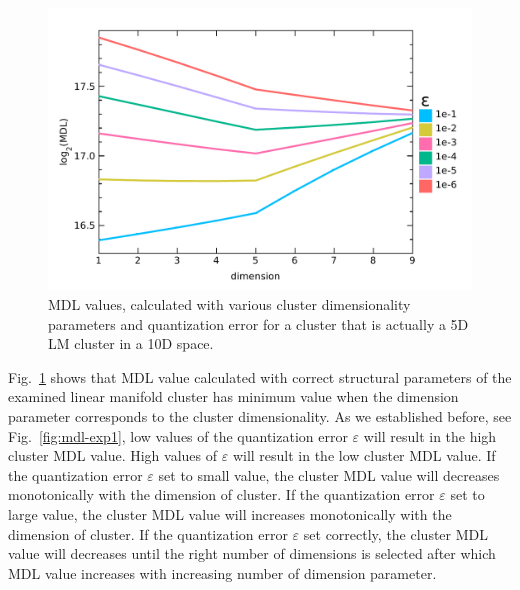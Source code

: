 \begin{figure}[ht]
\center
\includegraphics[width=\IfClass{IEEEtran}{3.5in}{4in}]{img/results_mdl-exp5_1.pdf}
\caption{MDL values, calculated with various cluster dimensionality parameters and quantization error \textepsilon for a cluster that is actually a 5D LM cluster in a 10D space.}
\label{fig:mdl-exp5}
\end{figure}



Fig.~\ref{fig:mdl-exp5} shows that MDL value calculated with correct structural
parameters of the examined linear manifold cluster has minimum value when
the dimension parameter corresponds to the cluster dimensionality.
As we established before, see Fig.~\ref{fig:mdl-exp1}, low values of
the quantization error $\varepsilon$ will result in the high cluster MDL value.
High values of $\varepsilon$  will result in the low cluster MDL value.
If the quantization error $\varepsilon$ set to small value, the cluster MDL
value will decreases monotonically with the dimension of cluster.
If the quantization error $\varepsilon$ set to large value, the cluster MDL
value will increases monotonically with the dimension of cluster.
If the quantization error $\varepsilon$ set correctly, the cluster MDL
value will decreases until the right number of dimensions is selected after
which MDL value increases with increasing number of dimension parameter.

